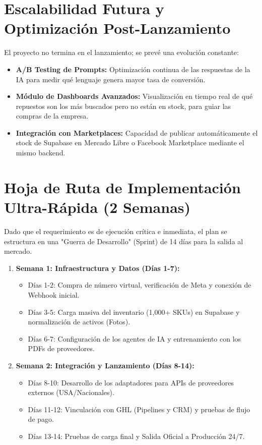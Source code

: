 \documentclass[12pt,a4paper]{article}
\begin{document}
\section{Escalabilidad Futura y Optimización Post-Lanzamiento}
El proyecto no termina en el lanzamiento; se prevé una evolución constante:
\begin{itemize}
    \item \textbf{A/B Testing de Prompts:} Optimización continua de las respuestas de la IA para medir qué lenguaje genera mayor tasa de conversión.
    \item \textbf{Módulo de Dashboards Avanzados:} Visualización en tiempo real de qué repuestos son los más buscados pero no est\'an en stock, para guiar las compras de la empresa.
    \item \textbf{Integración con Marketplaces:} Capacidad de publicar automáticamente el stock de Supabase en Mercado Libre o Facebook Marketplace mediante el mismo backend.
\end{itemize}

\section{Hoja de Ruta de Implementación Ultra-Rápida (2 Semanas)}
Dado que el requerimiento es de ejecución cr\'itica e inmediata, el plan se estructura en una "Guerra de Desarrollo" (Sprint) de 14 días para la salida al mercado.

\begin{enumerate}
    \item \textbf{Semana 1: Infraestructura y Datos (Días 1-7):}
    \begin{itemize}
        \item Días 1-2: Compra de número virtual, verificación de Meta y conexión de Webhook inicial.
        \item Días 3-5: Carga masiva del inventario (1,000+ SKUs) en Supabase y normalización de activos (Fotos).
        \item Días 6-7: Configuración de los agentes de IA y entrenamiento con los PDFs de proveedores.
    \end{itemize}
    \item \textbf{Semana 2: Integración y Lanzamiento (Días 8-14):}
    \begin{itemize}
        \item Días 8-10: Desarrollo de los adaptadores para APIs de proveedores externos (USA/Nacionales).
        \item Días 11-12: Vinculación con GHL (Pipelines y CRM) y pruebas de flujo de pago.
        \item Días 13-14: Pruebas de carga final y Salida Oficial a Producción 24/7.
    \end{itemize}
\end{enumerate}
\end{document}
